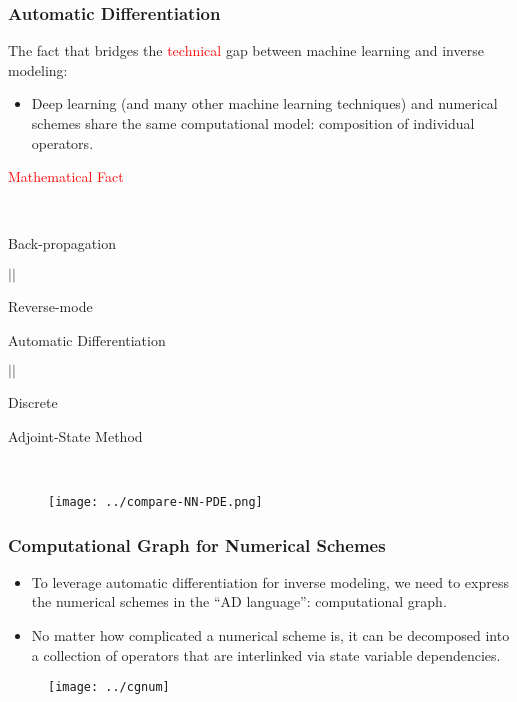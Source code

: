 \documentclass[usenames,dvipsnames]{beamer}
\begin{document}
\begin{frame}
	\frametitle{Automatic Differentiation}
The fact that bridges the \textcolor{red}{technical} gap between machine learning and inverse modeling:
	\begin{itemize}
		\item Deep learning (and many other machine learning techniques) and numerical schemes share the same computational model: composition of individual operators. 
	\end{itemize}
	

\begin{minipage}[b]{0.4\textwidth}




\begin{center}
\textcolor{red}{Mathematical Fact}

\

	Back-propagation 

$||$

Reverse-mode

 Automatic Differentiation 

$||$
 
 Discrete 
 
 Adjoint-State Method
\end{center}
\end{minipage}~
\begin{minipage}[b]{0.6\textwidth}
\begin{figure}[hbt]
\centering
  \texttt{[image: ../compare-NN-PDE.png]}
\end{figure}
\end{minipage}

\end{frame}


\begin{frame}
	\frametitle{Computational Graph for Numerical Schemes}
	
	\begin{itemize}
		\item To leverage automatic differentiation for inverse modeling, we need to express the numerical schemes in the ``AD language'': computational graph. 
		\item No matter how complicated a numerical scheme is, it can be decomposed into a collection of operators that are interlinked via state variable dependencies. 
	\end{itemize}
	
	\begin{figure}[hbt]
  \texttt{[image: ../cgnum]}
\end{figure}

	
	
\end{frame}
\end{document}
